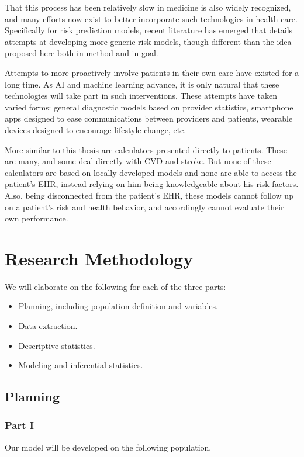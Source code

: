 \documentclass[a4paper,12pt]{article}
\begin{document}
	That this process has been relatively slow in medicine is also widely recognized, and many efforts now exist to better incorporate such technologies in health-care\cite{Obermeyer2016}. Specifically for risk prediction models, recent literature has emerged that details attempts at developing more generic risk models, though different than the idea proposed here both in method and in goal\cite{Rajkomar2018}.
	
	Attempts to more proactively involve patients in their own care have existed for a long time\cite{MedicineUSCommitteeonQualityofHealthCareinAmerica2001}. As AI and machine learning advance, it is only natural that these technologies will take part in such interventions. These attempts have taken varied forms: general diagnostic models based on provider statistics\cite{Aurbach2018}, smartphone apps designed to ease communications between providers and patients\cite{Sundberg2017}, wearable devices designed to encourage lifestyle change\cite{Gordon2017}, etc.
	
	More similar to this thesis are calculators presented directly to patients. These are many, and some deal directly with CVD and stroke\cite{Parmar2015}. But none of these calculators are based on locally developed models and none are able to access the patient's EHR, instead relying on him being knowledgeable about his risk factors. Also, being disconnected from the patient's EHR, these models cannot follow up on a patient's risk and health behavior, and accordingly cannot evaluate their own performance.
	
	\section{Research Methodology}
	We will elaborate on the following for each of the three parts:
	\begin{itemize}
		\item Planning, including population definition and variables.
		\item Data extraction.
		\item Descriptive statistics.
		\item Modeling and inferential statistics.
	\end{itemize}

	\subsection{Planning}
	
		\subsubsection{Part I}
		Our model will be developed on the following population.
		
\end{document}

